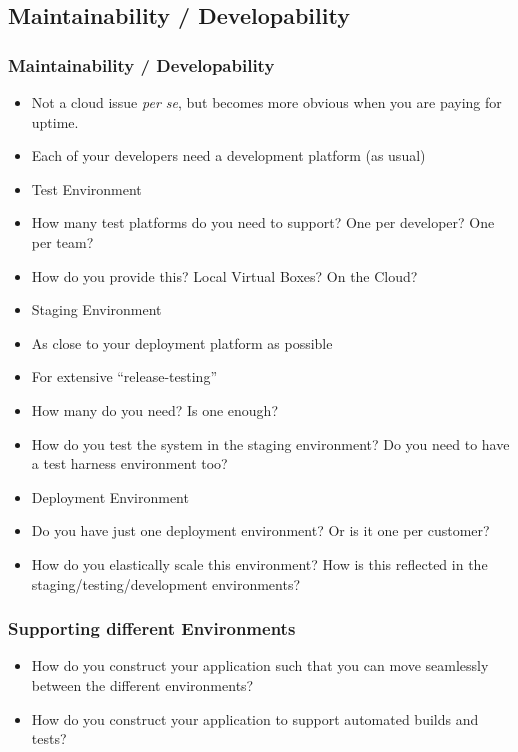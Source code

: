 \documentclass[10pt]{beamer}
\def\subitem{\item[\hspace{1.5cm} -]}
\begin{document}
\subsection{Maintainability / Developability}
\begin{frame}[t]
\frametitle{Maintainability / Developability}
\begin{scriptsize}
\begin{itemize}
\item Not a cloud issue \emph{per se}, but becomes more obvious when you are paying for uptime.
\item Each of your developers need a development platform (as usual)
\item Test Environment
\subitem How many test platforms do you need to support? One per developer? One per team?
\subitem How do you provide this? Local Virtual Boxes? On the Cloud?
\item Staging Environment
\subitem As close to your deployment platform as possible
\subitem For extensive ``release-testing''
\subitem How many do you need? Is one enough?
\subitem How do you test the system in the staging environment? Do you need to have a test harness environment too?
\item Deployment Environment
\subitem Do you have just one deployment environment? Or is it one per customer?
\subitem How do you elastically scale this environment? How is this reflected in the staging/testing/development environments?
\end{itemize}
\end{scriptsize}
\end{frame}

\begin{frame}[t]
\frametitle{Supporting different Environments}
\begin{itemize}
\item How do you construct your application such that you can move seamlessly between the different environments?
\item How do you construct your application to support automated builds and tests?
\end{itemize}
\end{frame}
\end{document}
